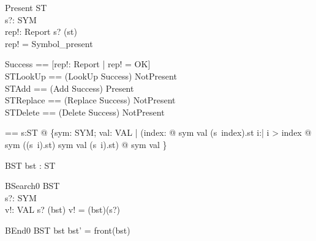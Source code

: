 \begin{schema}{Present}
  \Xi ST \\
  s?: SYM \\
  rep!: Report
\where
  s? \in \dom(st) \\
  rep! = Symbol\_present
\end{schema}

\begin{zed}
Success == [rep!: Report | rep! = OK] \\
STLookUp == (LookUp \land Success) \lor NotPresent \\
STAdd == (Add \land Success) \lor Present \\
STReplace == (Replace \land Success) \lor NotPresent \\
STDelete == (Delete \land Success) \lor NotPresent
\end{zed}


\begin{axdef}
  \distro == \lambda s:\seq ST @
      \{sym: SYM; val: VAL | (\exists index: \nat @ sym \mapsto val \in (s~index).st \land \forall i:\nat | i > index @ sym \notin \dom((s~i).st) \lor sym \mapsto val \in (s~i).st) @ sym \mapsto val \}
\end{axdef}

\begin{schema}{BST}
 bst : \seq ST \\
\end{schema}

\begin{schema}{BSearch0}
  \Xi BST \\
  s?: SYM \\
  v!: VAL
\where
  s? \in \dom(\distro bst) \land v! = (\distro bst)(s?)
\end{schema}


\begin{schema}{BEnd0}
  \Delta BST
\where
  bst \neq \langle\rangle \land bst' = front(bst)
\end{schema}

